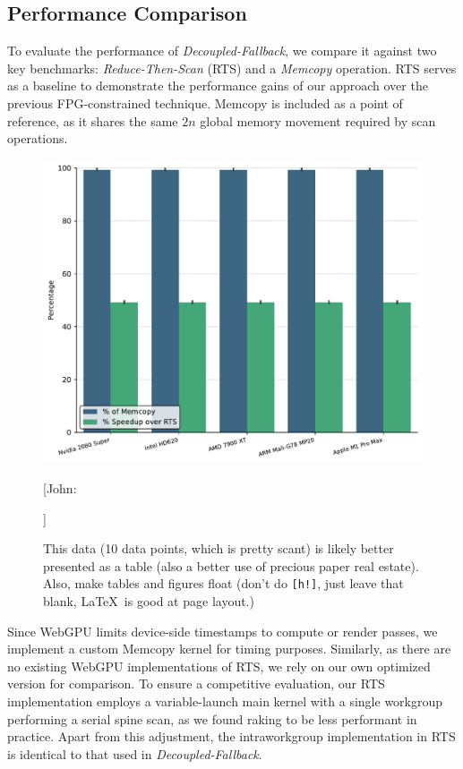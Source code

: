 \documentclass[sigconf]{acmart}
\newcommand{\john}[1]{{\footnotesize\color{cyan}[John: #1]}}
\begin{document}
\subsection{Performance Comparison}
To evaluate the performance of \emph{Decoupled-Fallback}, we compare it against two key benchmarks: \emph{Reduce-Then-Scan} (RTS) and a \emph{Memcopy} operation. RTS serves as a baseline to demonstrate the performance gains of our approach over the previous FPG-constrained technique. Memcopy is included as a point of reference, as it shares the same $2n$ global memory movement required by scan operations.
\begin{figure}[h!]
  \centering
  \includegraphics[width=\linewidth]{graphics/speedup.pdf}
  \john{\caption{This data (10 data points, which is pretty scant) is likely better presented as a table (also a better use of precious paper real estate). Also, make tables and figures float (don't do \texttt{[h!]}, just leave that blank, \LaTeX\ is good at page layout.)}}
\end{figure}
Since WebGPU limits device-side timestamps to compute or render passes, we implement a custom Memcopy kernel for timing purposes. Similarly, as there are no existing WebGPU implementations of RTS, we rely on our own optimized version for comparison. To ensure a competitive evaluation, our RTS implementation employs a variable-launch main kernel with a single workgroup performing a serial spine scan, as we found raking to be less performant in practice. Apart from this adjustment, the intraworkgroup implementation in RTS is identical to that used in \emph{Decoupled-Fallback}.
\end{document}

